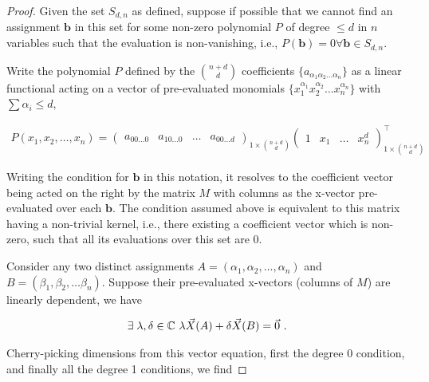\question

\begin{proof}
        Given the set \(S_{d, n}\) as defined, suppose if possible that we
        cannot find an assignment \(\mathbf{b}\) in this set for some non-zero
        polynomial \(P\) of degree \(\leq d\) in \(n\) variables such that the
        evaluation is non-vanishing, i.e., \(P(\mathbf{b}) = 0
        \forall\mathbf{b}\in S_{d, n}\).

        Write the polynomial \(P\) defined by the \(\binom{n+d}{d}\)
        coefficients \(\{a_{\alpha_1\alpha_2\ldots\alpha_n}\}\) as a linear
        functional acting on a vector of pre-evaluated monomials
        \(\{x_1^{\alpha_1}x_2^{\alpha_2}\ldots x_n^{\alpha_n}\}\) with \(\sum
        \alpha_i \leq d\),

        \begin{gather*}
            P(x_1, x_2, \ldots, x_n) = 
            \begin{pmatrix}
                a_{00\ldots 0} & a_{10\ldots 0} & \ldots & a_{00\ldots d}
            \end{pmatrix}_{1\times \binom{n+d}{d}}
            \begin{pmatrix}
                1 & x_1 & \ldots & x_n^d
            \end{pmatrix}^\top_{1\times \binom{n+d}{d}}
        \end{gather*}

        Writing the condition for \(\mathbf{b}\) in this notation, it resolves
        to the coefficient vector being acted on the right by the matrix \(M\)
        with columns as the x-vector pre-evaluated over each \(\mathbf{b}\). The
        condition assumed above is equivalent to this matrix having a
        non-trivial kernel, i.e., there existing a coefficient vector which is
        non-zero, such that all its evaluations over this set are 0.

        Consider any two distinct assignments \(A = (\alpha_1, \alpha_2, \ldots,
        \alpha_n)\) and \(B = (\beta_1, \beta_2, \ldots \beta_n)\). Suppose
        their pre-evaluated x-vectors (columns of \(M\)) are linearly dependent,
        we have

        \begin{gather*}
           \exists\;\lambda, \delta \in \mathbb{C} ~\lambda \vec{X}(A) + \delta \vec{X}(B) = \vec{0}~.
        \end{gather*}

        Cherry-picking dimensions from this vector equation, first the degree 0
        condition, and finally all the degree 1 conditions, we find


\end{proof}

